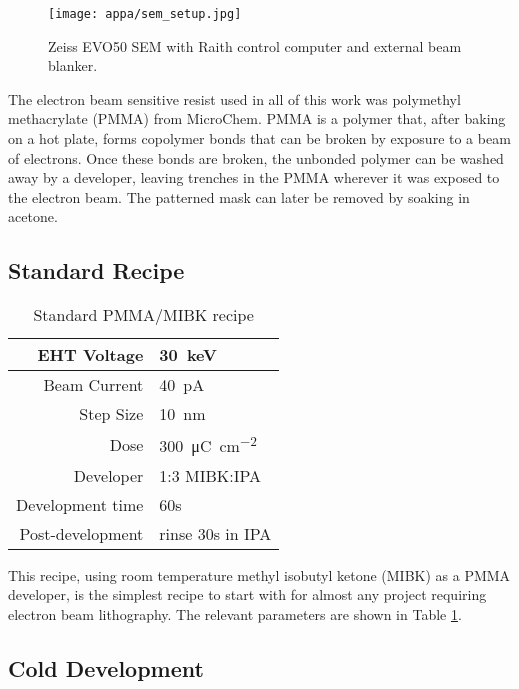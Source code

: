\begin{figure}
	\centering
	\texttt{[image: appa/sem\_setup.jpg]}
	\caption{Zeiss EVO50 SEM with Raith control computer and external beam blanker.}
	\label{fig:sem_setup}
\end{figure}

The electron beam sensitive resist used in all of this work was polymethyl methacrylate (PMMA) from MicroChem. PMMA is a polymer that, after baking on a hot plate, forms copolymer bonds that can be broken by exposure to a beam of electrons. Once these bonds are broken, the unbonded polymer can be washed away by a developer, leaving trenches in the PMMA wherever it was exposed to the electron beam. The patterned mask can later be removed by soaking in acetone.

\subsection{Standard Recipe}

\begin{table}
	\centering
	\caption{Standard PMMA/MIBK recipe}
    \begin{tabular}{ r | l }
    	\hline
    	EHT Voltage & \SI{30}{\kilo\electronvolt} \\ \hline
    	Beam Current & \SI{40}{\pico\ampere} \\ \hline
    	Step Size & \SI{10}{\nano\meter} \\ \hline
    	Dose & \SI{300}{\micro\coulomb\per\square\centi\meter} \\ \hline
    	Developer & 1:3 MIBK:IPA \\ \hline
    	Development time & 60s \\ \hline
    	Post-development & rinse 30s in IPA \\ \hline
    \end{tabular}
    \label{table:standard_pmma}
\end{table}

This recipe, using room temperature methyl isobutyl ketone (MIBK) as a PMMA developer, is the simplest recipe to start with for almost any project requiring electron beam lithography. The relevant parameters are shown in Table \ref{table:standard_pmma}.

\subsection{Cold Development}

